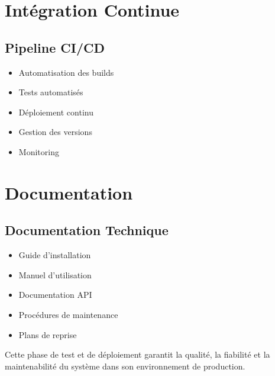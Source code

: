 \section{Intégration Continue}
\subsection{Pipeline CI/CD}
\begin{itemize}
    \item Automatisation des builds
    \item Tests automatisés
    \item Déploiement continu
    \item Gestion des versions
    \item Monitoring
\end{itemize}

\section{Documentation}
\subsection{Documentation Technique}
\begin{itemize}
    \item Guide d'installation
    \item Manuel d'utilisation
    \item Documentation API
    \item Procédures de maintenance
    \item Plans de reprise
\end{itemize}

Cette phase de test et de déploiement garantit la qualité, la fiabilité et la maintenabilité du système dans son environnement de production. 